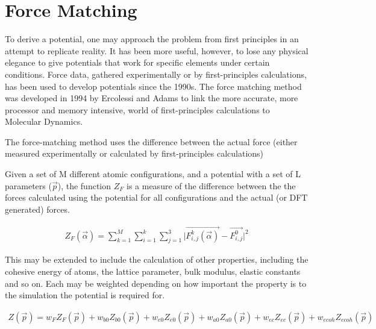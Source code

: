\documentclass[12pt,twoside]{manual}
\begin{document}
\section{Force Matching}

To derive a potential, one may approach the problem from first principles in an attempt to replicate reality.  It has been more useful, however, to lose any physical elegance \cite{twobandackland} to give potentials that work for specific elements under certain conditions.  Force data, gathered experimentally or by first-principles calculations, has been used to develop potentials since the 1990s.  The force matching method was developed in 1994 by Ercolessi and Adams \cite{forcematchingmethod} to link the more accurate, more processor and memory intensive, world of first-principles calculations to Molecular Dynamics.

The force-matching method uses the difference between the actual force (either measured experimentally or calculated by first-principles calculations) 

Given a set of M different atomic configurations, and a potential with a set of L parameters ($ \vec{p} $), the function $Z_F$ is a measure of the difference between the the forces calculated using the potential for all configurations and the actual (or DFT generated) forces.

\begin{equation}
\begin{split}
Z_F(\vec{\alpha}) = \sum _{k=1}^M \sum _{i=1} ^{k} \sum _{j=1} ^{3} \lvert \vec{F^k_{i,j} (\vec{\alpha})} - \vec{F^0_{i,j}} \rvert^2
\end{split}
\label{eq:eqForceMatchingB}
\end{equation}

This may be extended to include the calculation of other properties, including the cohesive energy of atoms, the lattice parameter, bulk modulus, elastic constants and so on.  Each may be weighted depending on how important the property is to the simulation the potential is required for.

\begin{equation}
\begin{split}
Z(\vec{p}) = w_{F} Z_F(\vec{p}) + w_{b0} Z_{b0}(\vec{p}) + w_{e0} Z_{e0}(\vec{p}) + w_{a0} Z_{a0}(\vec{p}) + w_{ec} Z_{ec}(\vec{p}) + w_{ecoh} Z_{ecoh}(\vec{p})
\end{split}
\label{eq:eqForceMatchingA}
\end{equation}
\end{document}
